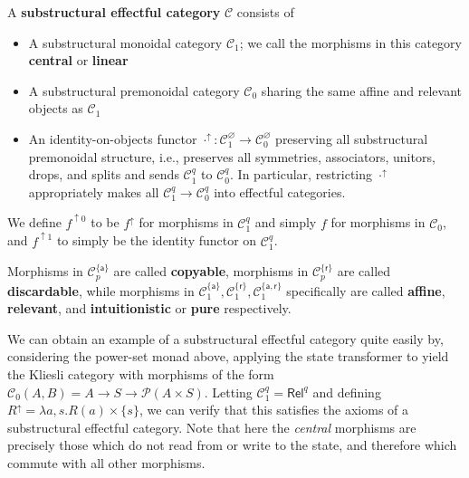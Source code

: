 \documentclass[acmsmall,screen,review]{acmart}
\newcommand{\mc}[1]{\ensuremath{\mathcal{#1}}}
\newcommand{\ms}[1]{\ensuremath{\mathsf{#1}}}
\newcommand{\upg}[2]{{#1}^{\uparrow #2}}
\begin{document}
\begin{definition}
  A \textbf{substructural effectful category} \(\mc{C}\) consists of
  \begin{itemize}
    \item A substructural monoidal category \(\mc{C}_1\); we call the morphisms in this category \textbf{central} or \textbf{linear}
    \item A substructural premonoidal category \(\mc{C}_0\) sharing the same affine and relevant objects as \(\mc{C}_1\)
    \item An identity-on-objects functor \(\upg{\cdot}{}: \mc{C}_1^\varnothing \to \mc{C}_0^\varnothing\) preserving all substructural premonoidal structure, i.e., preserves all symmetries, associators, unitors, drops, and splits and sends \(\mc{C}_1^q\) to \(\mc{C}_0^q\).
    In particular, restricting \(\upg{\cdot}{}\) appropriately makes all \(\mc{C}_1^q \to \mc{C}_0^q\) into effectful categories.
  \end{itemize}
  We define \(\upg{f}{0}\) to be \(\upg{f}{}\) for morphisms in \(\mc{C}_1^q\) and simply \(f\) for morphisms in \(\mc{C}_0\), and \(\upg{f}{1}\) to simply be the identity functor on \(\mc{C}_1^q\).
 
  Morphisms in \(\mc{C}_p^{\{\ms{a}\}}\) are called \textbf{copyable}, morphisms in \(\mc{C}_p^{\{\ms{r}\}}\) are called \textbf{discardable},
  while morphisms in \(\mc{C}_1^{\{\ms{a}\}}, \mc{C}_1^{\{\ms{r}\}}, \mc{C}_1^{\{\ms{a}, \ms{r}\}}\) specifically are called \textbf{affine}, \textbf{relevant}, and \textbf{intuitionistic} or \textbf{pure} respectively.
\end{definition}

We can obtain an example of a substructural effectful category quite easily by, considering the power-set monad above, applying the state transformer to yield the Kliesli category with morphisms of the form \(\mc{C}_0(A, B) = A \to S \to \mc{P}(A \times S)\). Letting \(\mc{C}_1^q = \ms{Rel}^q\) and defining
\(
  \upg{R}{} = \lambda a, s. R(a) \times \{s\}
\), we can verify that this satisfies the axioms of a substructural effectful category.
Note that here the \textit{central} morphisms are precisely those which do not read from or write to the state, and therefore which commute with all other morphisms.
\end{document}
